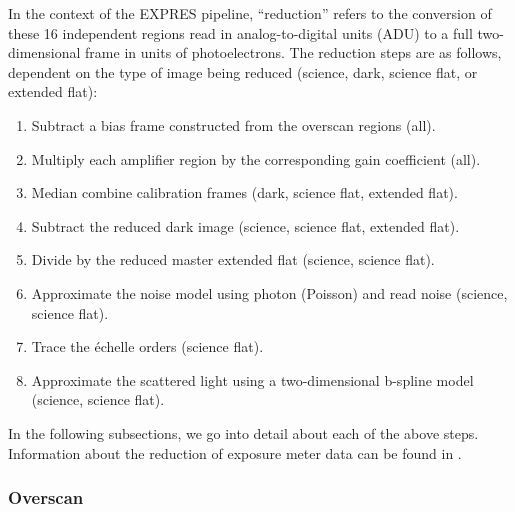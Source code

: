 In the context of the EXPRES pipeline, ``reduction'' refers to the conversion of these 16 independent regions read in analog-to-digital units (ADU) to a full two-dimensional frame in units of photoelectrons. The reduction steps are as follows, dependent on the type of image being reduced (science, dark, science flat, or extended flat):
\begin{enumerate}
    \item Subtract a bias frame constructed from the overscan regions (all).
    \item Multiply each amplifier region by the corresponding gain coefficient (all).
    \item Median combine calibration frames (dark, science flat, extended flat).
    \item Subtract the reduced dark image (science, science flat, extended flat).
    \item Divide by the reduced master extended flat (science, science flat).
    \item Approximate the noise model using photon (Poisson) and read noise (science, science flat).
    \item Trace the \'echelle orders (science flat).
    \item Approximate the scattered light using a two-dimensional b-spline model (science, science flat).
\end{enumerate}

In the following subsections, we go into detail about each of the above steps. Information about the reduction of exposure meter data can be found in \citet{blackman_measured_2019}.

\subsubsection{Overscan}
\label{pipeline:overscan}

